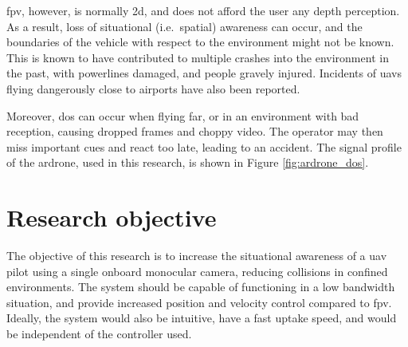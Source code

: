 \gls{fpv}, however, is normally \gls{2d}, and does not afford the user any depth perception.
As a result, loss of situational (i.e.\ spatial) awareness can occur, and the boundaries of the vehicle with respect to the environment might not be known.
This is known to have contributed to multiple crashes into the environment in the past, with powerlines damaged,\cite{latimes2015} and people gravely injured.\cite{seattletimes2015,bbcnews2015}
Incidents of \glspl{uav} flying dangerously close to airports have also been reported.\cite{ctvnews2014}

Moreover, \gls{dos} can occur when flying far, or in an environment with bad reception, causing dropped frames and choppy video.
The operator may then miss important cues and react too late, leading to an accident.
The signal profile of the \gls{ardrone}, used in this research, is shown in Figure \ref{fig:ardrone_dos}.

\section{Research objective}
The objective of this research is to increase the situational awareness of a \gls{uav} pilot using a single onboard monocular camera, reducing collisions in confined environments.
The system should be capable of functioning in a low bandwidth situation, and provide increased position and velocity control compared to \gls{fpv}.
Ideally, the system would also be intuitive, have a fast uptake speed, and would be independent of the controller used.
